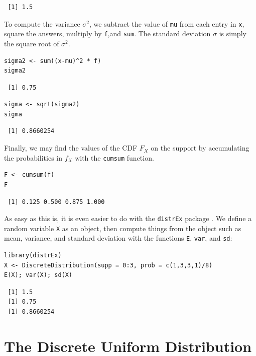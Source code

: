 \documentclass[captions=tableheading]{scrbook}
\begin{document}
\begin{verbatim}
 [1] 1.5
\end{verbatim}

To compute the variance \(\sigma^{2}\), we subtract the value of \texttt{mu} from each entry in \texttt{x}, square the answers, multiply by \texttt{f},and \texttt{sum}. The standard deviation \(\sigma\) is simply the square root of \(\sigma^{2}\).


\lstset{language=R}
\begin{lstlisting}
sigma2 <- sum((x-mu)^2 * f)
sigma2
\end{lstlisting}

\begin{verbatim}
 [1] 0.75
\end{verbatim}


\lstset{language=R}
\begin{lstlisting}
sigma <- sqrt(sigma2)
sigma
\end{lstlisting}

\begin{verbatim}
 [1] 0.8660254
\end{verbatim}

Finally, we may find the values of the CDF \(F_{X}\) on the support by accumulating the probabilities in \(f_{X}\) with the \texttt{cumsum} function. 


\lstset{language=R}
\begin{lstlisting}
F <- cumsum(f)
F
\end{lstlisting}

\begin{verbatim}
 [1] 0.125 0.500 0.875 1.000
\end{verbatim}

As easy as this is, it is even easier to do with the \texttt{distrEx} package \cite{Ruckdescheldistr}. We define a random variable \texttt{X} as an object, then compute things from the object such as mean, variance, and standard deviation with the functions \texttt{E}, \texttt{var}, and \texttt{sd}:


\lstset{language=R}
\begin{lstlisting}
library(distrEx)
X <- DiscreteDistribution(supp = 0:3, prob = c(1,3,3,1)/8)
E(X); var(X); sd(X)
\end{lstlisting}

\begin{verbatim}
 [1] 1.5
 [1] 0.75
 [1] 0.8660254
\end{verbatim}
\section{The Discrete Uniform Distribution}
\label{sec-5-2}
\label{sec-disc-uniform-dist}
\end{document}
